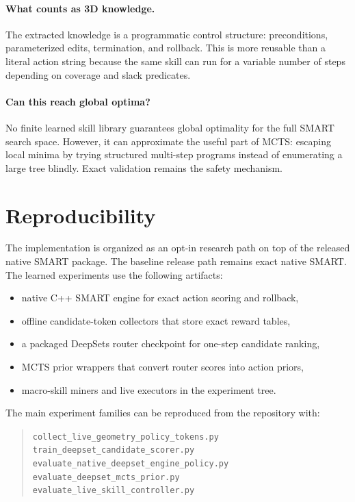 \documentclass[10pt,twocolumn,letterpaper]{article}
\begin{document}
\paragraph{What counts as 3D knowledge.}
The extracted knowledge is a programmatic control structure: preconditions,
parameterized edits, termination, and rollback.  This is more reusable than a
literal action string because the same skill can run for a variable number of
steps depending on coverage and slack predicates.

\paragraph{Can this reach global optima?}
No finite learned skill library guarantees global optimality for the full SMART
search space.  However, it can approximate the useful part of MCTS: escaping
local minima by trying structured multi-step programs instead of enumerating a
large tree blindly.  Exact validation remains the safety mechanism.

\section{Reproducibility}

The implementation is organized as an opt-in research path on top of the
released native SMART package.  The baseline release path remains exact native
SMART.  The learned experiments use the following artifacts:

\begin{itemize}
\item native C++ SMART engine for exact action scoring and rollback,
\item offline candidate-token collectors that store exact reward tables,
\item a packaged DeepSets router checkpoint for one-step candidate ranking,
\item MCTS prior wrappers that convert router scores into action priors,
\item macro-skill miners and live executors in the experiment tree.
\end{itemize}

The main experiment families can be reproduced from the repository with:

\begin{quote}
\small
\texttt{collect\_live\_geometry\_policy\_tokens.py}\\
\texttt{train\_deepset\_candidate\_scorer.py}\\
\texttt{evaluate\_native\_deepset\_engine\_policy.py}\\
\texttt{evaluate\_deepset\_mcts\_prior.py}\\
\texttt{evaluate\_live\_skill\_controller.py}
\end{quote}
\end{document}
